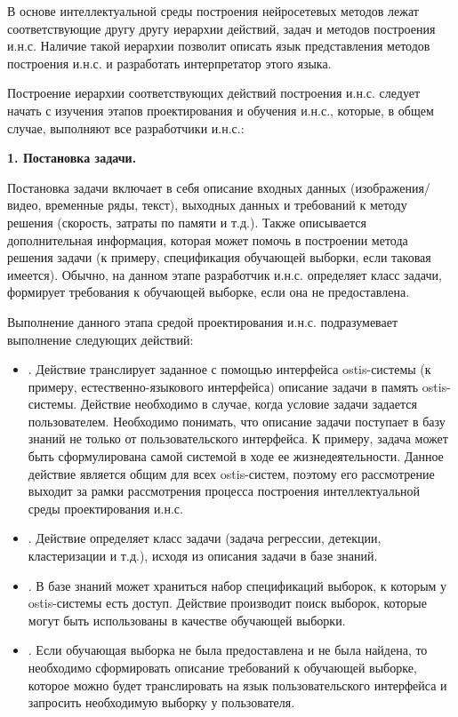 В основе интеллектуальной среды построения нейросетевых методов лежат соответствующие другу другу иерархии действий, задач и методов построения и.н.с. Наличие такой иерархии позволит описать язык представления методов построения и.н.с. и разработать интерпретатор этого языка.

Построение иерархии соответствующих действий построения и.н.с. следует начать с изучения этапов проектирования и обучения и.н.с., которые, в общем случае, выполняют все разработчики и.н.с.:


\textbf{1. Постановка задачи. }

Постановка задачи включает в себя описание входных данных (изображения/видео, временные ряды, текст), выходных данных и требований к методу решения (скорость, затраты по памяти и т.д.). Также описывается дополнительная информация, которая может помочь в построении метода решения задачи (к примеру, спецификация обучающей выборки, если таковая имеется). Обычно, на данном этапе разработчик и.н.с. определяет класс задачи, формирует требования к обучающей выборке, если она не предоставлена.

Выполнение данного этапа средой проектирования и.н.с. подразумевает выполнение следующих действий:
\begin{itemize}
	\item {}. Действие транслирует заданное с помощью интерфейса ostis-системы (к примеру, естественно-языкового интерфейса) описание задачи в память ostis-системы. Действие необходимо в случае, когда условие задачи задается пользователем. Необходимо понимать, что описание задачи поступает в базу знаний не только от пользовательского интерфейса. К примеру, задача может быть сформулирована самой системой в ходе ее жизнедеятельности.
	Данное действие является общим для всех ostis-систем, поэтому его рассмотрение выходит за рамки рассмотрения процесса построения интеллектуальной среды проектирования и.н.с.
	\item {}. Действие определяет класс задачи (задача регрессии, детекции, кластеризации и т.д.), исходя из описания задачи в базе знаний.
	\item {}. В базе знаний может храниться набор спецификаций выборок, к которым у ostis-системы есть доступ. Действие производит поиск выборок, которые могут быть использованы в качестве обучающей выборки.
	\item {}. Если обучающая выборка не была предоставлена и не была найдена, то необходимо сформировать описание требований к обучающей выборке, которое можно будет транслировать на язык пользовательского интерфейса и запросить необходимую выборку у пользователя.
\end{itemize}



